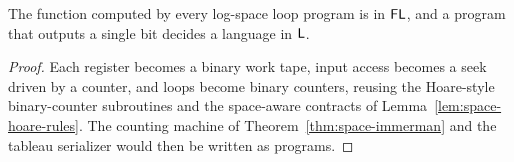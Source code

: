 \begin{theorem}
  \label{thm:space-logspace-compiler}
  \notready
  The function computed by every log-space loop program is in $\mathsf{FL}$, and a
  program that outputs a single bit decides a language in $\mathsf{L}$.
\end{theorem}
\begin{proof}
  Each register becomes a binary work tape, input access becomes a seek driven
  by a counter, and loops become binary counters, reusing the Hoare-style
  binary-counter subroutines and the space-aware contracts of
  Lemma~\ref{lem:space-hoare-rules}. The counting machine of
  Theorem~\ref{thm:space-immerman} and the tableau serializer would then be
  written as programs.
\end{proof}
